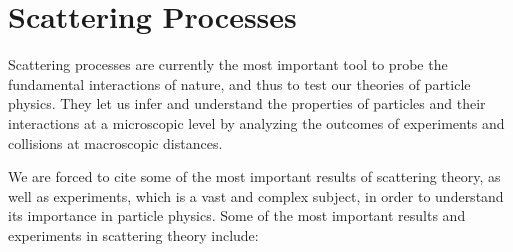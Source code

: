 \section{Scattering Processes}

Scattering processes are currently the most important tool to probe the fundamental interactions of nature, and thus to test our theories of particle physics. They let us infer and understand the properties of particles and their interactions at a microscopic level by analyzing the outcomes of experiments and collisions at macroscopic distances.

We are forced to cite some of the most important results of scattering theory, as well as experiments, which is a vast and complex subject, in order to understand its importance in particle physics. Some of the most important results and experiments in scattering theory include:
